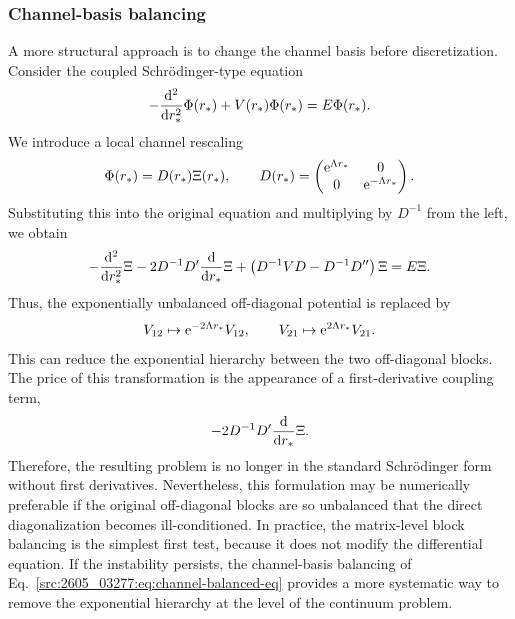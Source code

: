 \subsubsection{Channel-basis balancing}
A more structural approach is to change the channel basis before
discretization.
Consider the coupled Schr\"odinger-type equation
\begin{align}
    -
    \frac{\mathrm{d}^2}{\mathrm{d} r_*^2}
    \Phi(r_*)
    +
    V(r_*)\Phi(r_*)
    =
    E\Phi(r_*) .
\end{align}
We introduce a local channel rescaling
\begin{align}
    \Phi(r_*)
    =
    D(r_*)\Xi(r_*),
    \qquad
    D(r_*)
    =
    \begin{pmatrix}
        \mathrm{e}^{\Lambda r_*} & 0 \\
        0               & \mathrm{e}^{-\Lambda r_*}
    \end{pmatrix}.
\end{align}
Substituting this into the original equation and multiplying by $D^{-1}$ from
the left, we obtain
\begin{align}
    -
    \frac{\mathrm{d}^2}{\mathrm{d} r_*^2}
    \Xi
    -
    2D^{-1}D'
    \frac{\mathrm{d}}{\mathrm{d} r_*}
    \Xi
    +
    \left(
        D^{-1}VD
        -
        D^{-1}D''
    \right)
    \Xi
    =
    E\Xi .
    \label{src:2605_03277:eq:channel-balanced-eq}
\end{align}
Thus, the exponentially unbalanced off-diagonal potential is replaced by
\begin{align}
    V_{12}
    \mapsto
    \mathrm{e}^{-2\Lambda r_*} V_{12},
    \qquad
    V_{21}
    \mapsto
    \mathrm{e}^{2\Lambda r_*} V_{21}.
\end{align}
This can reduce the exponential hierarchy between the two off-diagonal
blocks.
The price of this transformation is the appearance of a first-derivative
coupling term,
\begin{align}
    -2D^{-1}D'
    \frac{\mathrm{d}}{\mathrm{d} r_*}\Xi .
\end{align}
Therefore, the resulting problem is no longer in the standard
Schr\"odinger form without first derivatives.
Nevertheless, this formulation may be numerically preferable if the original
off-diagonal blocks are so unbalanced that the direct diagonalization becomes
ill-conditioned.
In practice, the matrix-level block balancing is the simplest first test,
because it does not modify the differential equation.
If the instability persists, the channel-basis balancing of
Eq.~\eqref{src:2605_03277:eq:channel-balanced-eq} provides a more systematic way to remove
the exponential hierarchy at the level of the continuum problem.

